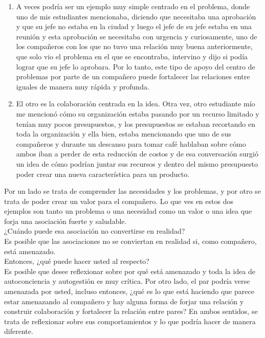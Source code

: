 \documentclass[10pt]{book}
\begin{document}
\begin{enumerate}[\bfseries I.]
\item A veces podría ser un ejemplo muy simple centrado en el problema, donde uno de mis estudiantes mencionaba, diciendo que necesitaba una aprobación y que su jefe no estaba en la ciudad y luego el jefe de su jefe estaba en una reunión y esta aprobación se necesitaba con urgencia y curiosamente, uno de los compañeros con los que no tuvo una relación muy buena anteriormente, que solo vio el problema en el que se encontraba, intervino y dijo si podía lograr que su jefe lo aprobara. Por lo tanto, este tipo de apoyo del centro de problemas por parte de un compañero puede fortalecer las relaciones entre iguales de manera muy rápida y profunda.
\item El otro es la colaboración centrada en la idea. Otra vez, otro estudiante mío me mencionó cómo su organización estaba pasando por un recurso limitado y tenían muy pocos presupuestos, y los presupuestos se estaban recortando en toda la organización y ella bien, estaba mencionando que uno de sus compañeros y  durante un descanso para tomar café hablaban sobre cómo ambos iban a perder de esta reducción de costos y de esa conversación surgió un idea de cómo podrían juntar sus recursos y dentro del mismo presupuesto poder crear una nueva característica para un producto.
\end{enumerate}
Por un lado se trata de comprender las necesidades y los problemas, y por otro se trata de poder crear un valor para el compañero. Lo que ves en estos dos ejemplos son tanto un problema o una necesidad como un valor o una idea que forja una asociación fuerte y saludable.\\
¿Cuándo puede esa asociación no convertirse en realidad?\\
Es posible que las asociaciones no se conviertan en realidad si, como compañero, está amenazado.\\
Entonces, ¿qué puede hacer usted al respecto?\\
Es posible que desee reflexionar sobre por qué está amenazado y toda la idea de autoconciencia y autogestión es muy crítica. Por otro lado, el par podría verse amenazada por usted, incluso entonces, ¿qué es lo que está haciendo que parece estar amenazando al compañero y hay alguna forma de forjar una relación y construir colaboración y fortalecer la relación entre pares? En ambos sentidos, se trata de reflexionar sobre sus comportamientos y lo que podría hacer de manera diferente.
\end{document}
